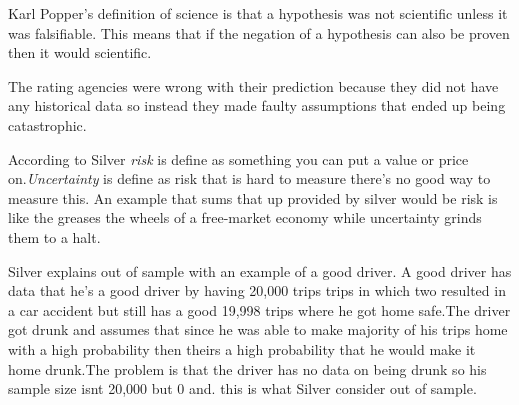 \documentclass[12pt]{article}
\begin{document}
\begin{enumerate}

Karl Popper's definition of science is that a hypothesis was not scientific unless it was falsifiable. This means that if the negation of a hypothesis can also be proven then it would scientific. 


The rating agencies were wrong with their prediction because they did not have any historical data so instead they made faulty assumptions that ended up being catastrophic.  


According to Silver \emph{risk} is define as something you can put a value or price on.\emph{Uncertainty} is define as risk that is hard to measure there's no good way to measure this. An example that sums that up provided by silver would be risk is like the greases the wheels of a free-market economy while uncertainty grinds them to a halt.


Silver explains out of sample with an example of a good driver. A good driver has data that he's a good driver by having 20,000 trips trips in which two resulted in a car accident but still has a good 19,998 trips where he got home safe.The driver got drunk and assumes that since he was able to make majority of his trips home with a high probability then theirs a high probability that he would make it home drunk.The problem is that the driver has no data on being drunk so his sample size isnt 20,000 but 0 and. this is what Silver consider out of sample.


\end{enumerate}
\end{document}
